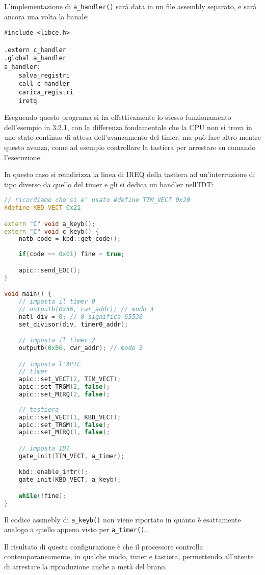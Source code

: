 \documentclass[a4paper,11pt]{article}
\begin{document}
L'implementazione di \lstinline|a_handler()| sarà data in un file assembly separato, e sarà ancora una volta la banale:
\begin{lstlisting}[language=assembler, style=codestyle]
#include <libce.h>

.extern c_handler
.global a_handler
a_handler:
	salva_registri
	call c_handler
	carica_registri
	iretq
\end{lstlisting}

Eseguendo questo programa si ha effettivamente lo stesso funzionamento dell'esempio in 3.2.1, con la differenza fondamentale che la CPU non si trova in uno stato continuo di attesa dell'avanzamento del timer, ma può fare altro mentre questo avanza, come ad esempio controllare la tastiera per arrestare su comando l'esecuzione.

In questo caso si reindirizza la linea di IREQ della tastiera ad un'interruzione di tipo diverso da quello del timer e gli si dedica un handler nell'IDT:
\begin{lstlisting}[language=C++, style=codestyle]	
// ricordiamo che si e' usato #define TIM_VECT 0x20
#define KBD_VECT 0x21

extern "C" void a_keyb();
extern "C" void c_keyb() {
	natb code = kbd::get_code();
	
	if(code == 0x01) fine = true;

	apic::send_EOI();
}

void main() {
	// imposta il timer 0
	// outputb(0x36, cwr_addr); // modo 3
	natl div = 0; // 0 significa 65536
	set_divisor(div, timer0_addr);

	// imposta il timer 2
	outputb(0xB6, cwr_addr); // modo 3

	// imposta l'APIC
	// timer
	apic::set_VECT(2, TIM_VECT);
	apic::set_TRGM(2, false);
	apic::set_MIRQ(2, false);
	
	// tastiera
	apic::set_VECT(1, KBD_VECT);
	apic::set_TRGM(1, false);
	apic::set_MIRQ(1, false);

	// imposta IDT
	gate_init(TIM_VECT, a_timer);

	kbd::enable_intr();
	gate_init(KBD_VECT, a_keyb);

	while(!fine);
}
\end{lstlisting}

Il codice assmebly di \lstinline|a_keyb()| non viene riportato in quanto è esattamente analogo a quello appena visto per \lstinline|a_timer()|.

Il risultato di questa configurazione è che il processore controlla contemporaneamente, in qualche modo, timer e tastiera, permettendo all'utente di arrestare la riproduzione anche a metà del brano.
\end{document}
